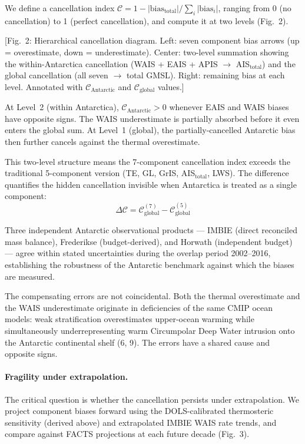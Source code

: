 \documentclass[11pt]{article}
\begin{document}
We define a cancellation index $\mathcal{C} = 1 - |\text{bias}_{\text{total}}| / \sum_i |\text{bias}_i|$, ranging from 0 (no cancellation) to 1 (perfect cancellation), and compute it at two levels (Fig.~2).

[Fig.~2: Hierarchical cancellation diagram. Left: seven component bias arrows (up = overestimate, down = underestimate). Center: two-level summation showing the within-Antarctica cancellation (WAIS + EAIS + APIS $\to$ AIS$_{\text{total}}$) and the global cancellation (all seven $\to$ total GMSL). Right: remaining bias at each level. Annotated with $\mathcal{C}_{\text{Antarctic}}$ and $\mathcal{C}_{\text{global}}$ values.]

At Level~2 (within Antarctica), $\mathcal{C}_{\text{Antarctic}} > 0$ whenever EAIS and WAIS biases have opposite signs.  The WAIS underestimate is partially absorbed before it even enters the global sum.  At Level~1 (global), the partially-cancelled Antarctic bias then further cancels against the thermal overestimate.

This two-level structure means the 7-component cancellation index exceeds the traditional 5-component version (TE, GL, GrIS, AIS$_{\text{total}}$, LWS).  The difference quantifies the hidden cancellation invisible when Antarctica is treated as a single component:
$$\Delta\mathcal{C} = \mathcal{C}_{\text{global}}^{(7)} - \mathcal{C}_{\text{global}}^{(5)}$$

Three independent Antarctic observational products --- IMBIE (direct reconciled mass balance), Frederikse (budget-derived), and Horwath (independent budget) --- agree within stated uncertainties during the overlap period 2002--2016, establishing the robustness of the Antarctic benchmark against which the biases are measured.

The compensating errors are not coincidental.  Both the thermal overestimate and the WAIS underestimate originate in deficiencies of the same CMIP ocean models: weak stratification overestimates upper-ocean warming while simultaneously underrepresenting warm Circumpolar Deep Water intrusion onto the Antarctic continental shelf (6, 9).  The errors have a shared cause and opposite signs.


\paragraph{Fragility under extrapolation.}

The critical question is whether the cancellation persists under extrapolation.  We project component biases forward using the DOLS-calibrated thermosteric sensitivity (derived above) and extrapolated IMBIE WAIS rate trends, and compare against FACTS projections at each future decade (Fig.~3).
\end{document}
